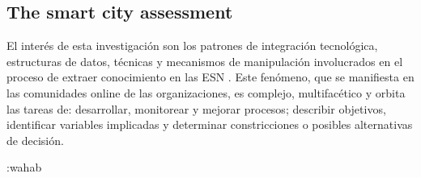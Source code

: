 \documentclass[a4paper,fleqn,spanish]{cas-dc}
\begin{document}
\subsection{ The smart city assessment}\label{afirmacion}

El interés de esta investigación son los patrones de integración tecnológica,
estructuras de datos, técnicas y mecanismos de manipulación involucrados en el
proceso de extraer conocimiento en las ESN \cite{stubinger_understanding_2020}. Este
fenómeno, que se manifiesta en las comunidades online de las organizaciones, es
complejo, multifacético y orbita las tareas de: desarrollar, monitorear y
mejorar procesos; describir objetivos, identificar variables implicadas y
determinar constricciones o posibles alternativas de decisión.




:wahab%
\end{document}
